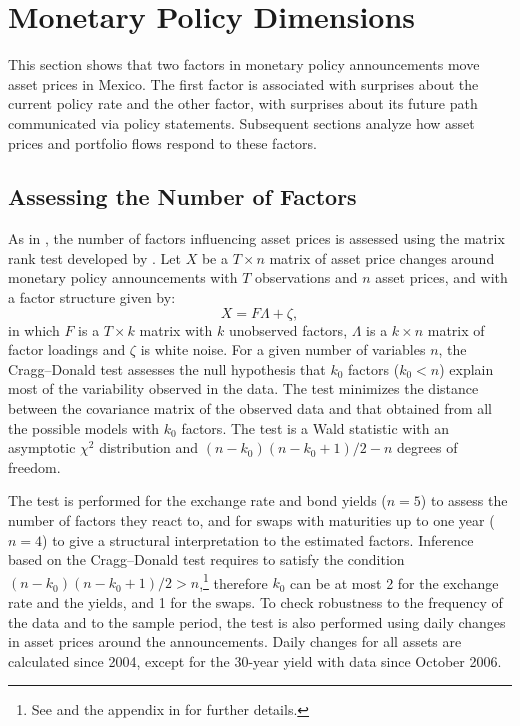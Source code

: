 \documentclass[a4paper, 12pt]{article}
\providecommand{\assets}{X}
\providecommand{\factors}{F}
\providecommand{\loadings}{\Lambda}
\providecommand{\dimobs}{T}
\providecommand{\dimassets}{n}
\providecommand{\dimfactors}{k}
\providecommand{\dimnull}{\dimfactors_{0}}
\providecommand{\dimsassets}{\dimobs \times \dimassets}
\providecommand{\dimsfactors}{\dimobs \times \dimfactors}
\providecommand{\dimsloadings}{\dimfactors \times \dimassets}
\providecommand{\errorfac}{\zeta}
\newcommand{\eqPCA}{\assets = \factors \loadings + \errorfac}
\begin{document}
\section{Monetary Policy Dimensions} \label{sec:statements}
This section shows that two factors in monetary policy announcements move asset prices in Mexico. The first factor is associated with surprises about the current policy rate and the other factor, with surprises about its future path communicated via policy statements. Subsequent sections analyze how asset prices and portfolio flows respond to these factors.

\subsection{Assessing the Number of Factors}
As in \textcite{GSS:2005a}, the number of factors influencing asset prices is assessed using the matrix rank test developed by \textcite{CraggDonald:1997}. 
Let \(\assets\) be a \(\dimsassets\) matrix of asset price changes around monetary policy announcements with \(\dimobs\) observations and \(\dimassets\) asset prices, and with a factor structure given by:
\begin{equation} \label{eq:nPCA}
	\eqPCA ,
\end{equation}
\noindent in which \(\factors\) is a \(\dimsfactors\) matrix with \(\dimfactors\) unobserved factors, \(\loadings\) is a \(\dimsloadings\) matrix of factor loadings and \(\errorfac\) is white noise.
For a given number of variables \(n\), the Cragg--Donald test assesses the null hypothesis that \(\dimnull\) factors (\(\dimnull < \dimassets\)) explain most of the variability observed in the data. The test minimizes the distance between the covariance matrix of the observed data and that obtained from all the possible models with \(k_{0}\) factors. The test is a Wald statistic with an asymptotic \(\chi^2\) distribution and \( \left( \dimassets - \dimnull \right) \left( \dimassets - \dimnull + 1 \right) /2 - \dimassets \) degrees of freedom. 

The test is performed for the exchange rate and bond yields (\( \dimassets = 5 \)) to assess the number of factors they react to, and for swaps with maturities up to one year (\( \dimassets = 4 \)) to give a structural interpretation to the estimated factors. 
Inference based on the Cragg--Donald test requires to satisfy the condition \( \left( \dimassets - \dimnull \right) \left( \dimassets - \dimnull + 1 \right) /2 > \dimassets \),\footnote{ See \textcite{CraggDonald:1997} and the appendix in \textcite{GSS:2005a} for further details.} therefore \( \dimnull \) can be at most 2 for the exchange rate and the yields, and 1 for the swaps. 
To check robustness to the frequency of the data and to the sample period, the test is also performed using daily changes in asset prices around the announcements. 
Daily changes for all assets are calculated since 2004, except for the 30-year yield with data since October 2006.
\end{document}
